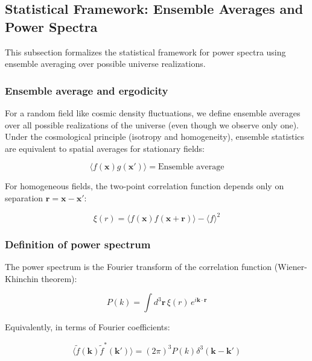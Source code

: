 \subsection{Statistical Framework: Ensemble Averages and Power Spectra}\label{subsec:ps_statistical}

This subsection formalizes the statistical framework for power spectra using ensemble averaging over possible universe realizations.

\subsubsection{Ensemble average and ergodicity}

For a random field like cosmic density fluctuations, we define ensemble averages over all possible realizations of the universe (even though we observe only one). Under the cosmological principle (isotropy and homogeneity), ensemble statistics are equivalent to spatial averages for stationary fields:

\begin{equation}
\langle f(\mathbf{x}) g(\mathbf{x}') \rangle = \text{Ensemble average}
\end{equation}

For homogeneous fields, the two-point correlation function depends only on separation $\mathbf{r} = \mathbf{x} - \mathbf{x}'$:

\begin{equation}
\xi(r) = \langle f(\mathbf{x}) f(\mathbf{x} + \mathbf{r}) \rangle - \langle f \rangle^2
\end{equation}

\subsubsection{Definition of power spectrum}

The power spectrum is the Fourier transform of the correlation function (Wiener-Khinchin theorem):

\begin{equation}
P(k) = \int d^3\mathbf{r} \, \xi(r) \, e^{i\mathbf{k} \cdot \mathbf{r}}
\end{equation}

Equivalently, in terms of Fourier coefficients:

\begin{equation}
\langle \tilde{f}(\mathbf{k}) \tilde{f}^*(\mathbf{k}') \rangle = (2\pi)^3 P(k) \delta^3(\mathbf{k} - \mathbf{k}')
\label{eq:power_spectrum_def}
\end{equation}

